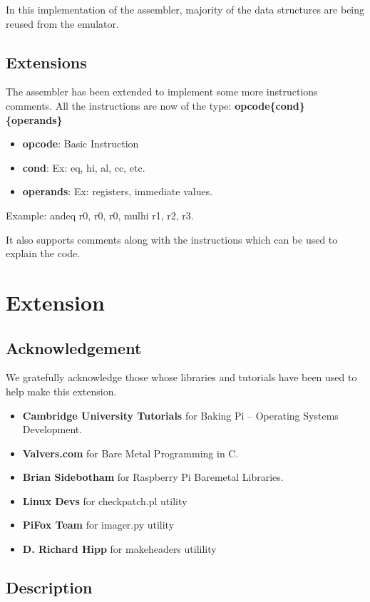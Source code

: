 \documentclass[11pt]{article}
\begin{document}
In this implementation of the assembler, majority of the data structures are
being reused from the emulator.

\subsection{Extensions}

The assembler has been extended to implement some more instructions comments.
All the instructions are now of the type:
\textbf{opcode\{cond\} \{operands\}}
\begin{itemize}[noitemsep,topsep=0pt]
  \item \textbf{opcode}: Basic Instruction
  \item \textbf{cond}: Ex: eq, hi, al, cc, etc.
  \item \textbf{operands}: Ex: registers, immediate values.
\end{itemize}
Example: andeq r0, r0, r0, mulhi r1, r2, r3.

It also supports comments along with the instructions which can be used to
explain the code.

\section{Extension}

\subsection{Acknowledgement}

We gratefully acknowledge those  whose libraries and tutorials have been used
to help make this extension.

\begin{itemize}[noitemsep,topsep=0pt]
  \item \textbf{Cambridge University Tutorials} for Baking Pi –
    Operating Systems Development.
  \item \textbf{Valvers.com} for Bare Metal Programming in C.
  \item \textbf{Brian Sidebotham} for Raspberry Pi Baremetal Libraries.
  \item \textbf{Linux Devs} for checkpatch.pl utility
  \item \textbf{PiFox Team} for imager.py utility
  \item \textbf{D. Richard Hipp} for makeheaders utilility
\end{itemize}

\subsection{Description}
\end{document}
